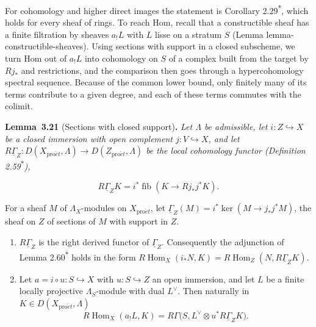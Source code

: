 \documentclass[11pt]{article}
\newenvironment{bpstatement}[2]{\par\addvspace{0.6\baselineskip}\noindent\textbf{#1}#2\textbf{.}\enspace\ignorespaces}
  {\par\addvspace{0.4\baselineskip}}
\newenvironment{bpstatementit}[2]{\begin{bpstatement}{#1}{#2}\itshape\ignorespaces}{\end{bpstatement}}
\newcommand{\bpout}[1]{#1\textsuperscript{\hyperlink{bp-outside}{\ensuremath{\ast}}}}
\providecommand{\fib}{}\renewcommand{\fib}{\operatorname{fib}}
\begin{document}
For cohomology and higher direct images the statement is Corollary \bpout{2.29}, which holds for every sheaf of rings. To reach Hom, recall that a constructible sheaf has a finite filtration by sheaves \(a_!L\) with \(L\) lisse on a stratum \(S\) (Lemma lemma-constructible-sheaves). Using sections with support in a closed subscheme, we turn Hom out of \(a_!L\) into cohomology on \(S\) of a complex built from the target by \(Rj_*\) and restrictions, and the comparison then goes through a hypercohomology spectral sequence. Because of the common lower bound, only finitely many of its terms contribute to a given degree, and each of these terms commutes with the colimit.

\label{bp65}%
\begin{bpstatementit}{Lemma~3.21}{ (Sections with closed support)}
Let \(\Lambda\) be admissible, let \(i:Z\hookrightarrow X\) be a closed immersion with open complement \(j:V\hookrightarrow X\), and let \(R\underline\Gamma_Z:D(X_{\mathrm{pro}\acute{e}t},\Lambda)\to D(Z_{\mathrm{pro}\acute{e}t},\Lambda)\) be the local cohomology functor (Definition \bpout{2.59}),

\[
R\underline\Gamma_Z K=i^*\fib(K\longrightarrow Rj_*j^*K).
\]

For a sheaf \(M\) of \(\Lambda_X\)-modules on \(X_{\mathrm{pro}\acute{e}t}\), let \(\underline\Gamma_Z(M)=i^*\ker(M\to j_*j^*M)\), the sheaf on \(Z\) of sections of \(M\) with support in \(Z\).

\begin{enumerate}
\item \(R\underline\Gamma_Z\) is the right derived functor of \(\underline\Gamma_Z\). Consequently the adjunction of Lemma \bpout{2.60} holds in the form \(R\!\operatorname{Hom}_X(i_*N,K)=R\!\operatorname{Hom}_Z(N,R\underline\Gamma_ZK)\).
\item Let \(a=i\circ u:S\hookrightarrow X\) with \(u:S\hookrightarrow Z\) an open immersion, and let \(L\) be a finite locally projective \(\Lambda_S\)-module with dual \(L^\vee\). Then naturally in \(K\in D(X_{\mathrm{pro}\acute{e}t},\Lambda)\) \[
   R\!\operatorname{Hom}_X(a_!L,K)
   =R\Gamma\bigl(S,L^\vee\otimes u^*R\underline\Gamma_ZK\bigr).
   \tag{3.1}
   \]
\end{enumerate}
\end{bpstatementit}
\end{document}
